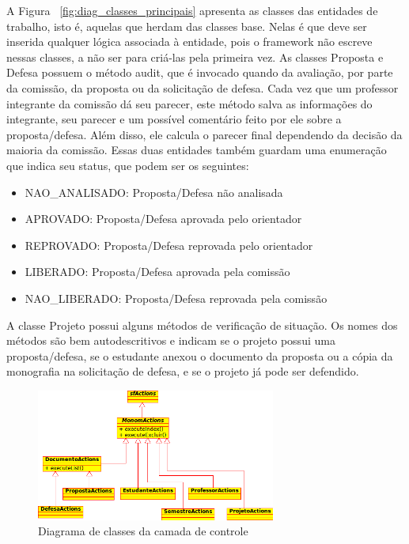 A Figura ~\ref{fig:diag_classes_principais} apresenta as classes das entidades de trabalho, 
isto é, aquelas que herdam das classes base. Nelas é que deve ser inserida qualquer lógica associada
à entidade, pois o framework não escreve nessas classes, a não ser para criá-las pela primeira vez.
As classes Proposta e Defesa possuem o método audit, que é invocado quando da avaliação, por parte da comissão,
da proposta ou da solicitação de defesa. Cada vez que um professor integrante da comissão dá seu parecer,
este método salva as informações do integrante, seu parecer e um possível comentário feito por ele
sobre a proposta/defesa. Além disso, ele calcula o parecer final dependendo da decisão da maioria 
da comissão. Essas duas entidades também guardam uma enumeração que indica seu status, que podem ser os
seguintes:

\begin{itemize}
\item NAO\_ANALISADO: Proposta/Defesa não analisada
\item APROVADO: Proposta/Defesa aprovada pelo orientador
\item REPROVADO: Proposta/Defesa reprovada pelo orientador
\item LIBERADO: Proposta/Defesa aprovada pela comissão
\item NAO\_LIBERADO: Proposta/Defesa reprovada pela comissão
\end{itemize}

A classe Projeto possui alguns métodos de verificação de situação. Os nomes dos métodos são bem 
autodescritivos e indicam se o projeto possui uma proposta/defesa, se o estudante anexou o documento
da proposta ou a cópia da monografia na solicitação de defesa, e se o projeto já pode ser defendido.

\begin{figure}[htbp]
\centering
\includegraphics[width=0.7\textwidth]{fig/uml_controllers.png}
\caption{Diagrama de classes da camada de controle}
\label{fig:diag_controllers}
\end{figure}

